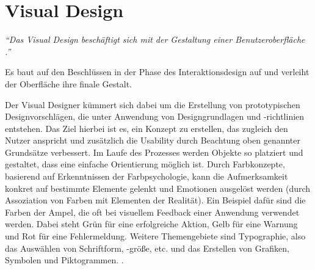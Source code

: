 \section{Visual Design} \label{sec:uid}
\textit{\enquote{Das Visual Design beschäftigt sich mit der Gestaltung einer Benutzeroberfläche \newline\cite[S. 182]{Moser2012}.}}\par
Es baut auf den Beschlüssen in der Phase des Interaktionsdesign auf und verleiht der Oberfläche ihre finale Gestalt.\par
Der Visual Designer kümmert sich dabei um die Erstellung von prototypischen Designvorschlägen, die unter Anwendung von Designgrundlagen und -richtlinien entstehen. Das Ziel hierbei ist es, ein Konzept zu erstellen, das zugleich den Nutzer anspricht und zusätzlich die Usability durch Beachtung oben genannter Grundsätze verbessert. Im Laufe des Prozesses werden Objekte so platziert und gestaltet, dass eine einfache Orientierung möglich ist. Durch Farbkonzepte, basierend auf Erkenntnissen der Farbpsychologie, kann die Aufmerksamkeit konkret auf bestimmte Elemente gelenkt und Emotionen ausgelöst werden (durch Assoziation von Farben mit Elementen der Realität). Ein Beispiel dafür sind die Farben der Ampel, die oft bei visuellem Feedback einer Anwendung verwendet werden. Dabei steht Grün für eine erfolgreiche Aktion, Gelb für eine Warnung und Rot für eine Fehlermeldung. Weitere Themengebiete sind Typographie, also das Auswählen von Schriftform, -größe, etc. und das Erstellen von Grafiken, Symbolen und Piktogrammen. \cite[S. 182]{Moser2012}.

